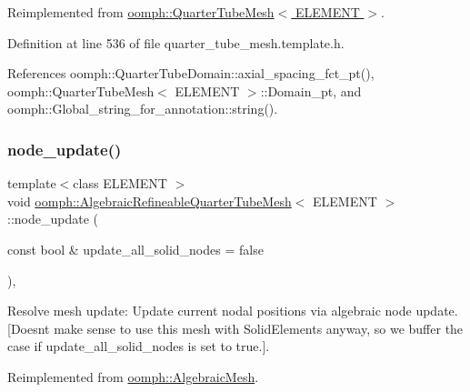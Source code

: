 Reimplemented from \hyperlink{classoomph_1_1QuarterTubeMesh_a5c880d6214a07676a533227f813634d8}{oomph\+::\+Quarter\+Tube\+Mesh$<$ E\+L\+E\+M\+E\+N\+T $>$}.



Definition at line 536 of file quarter\+\_\+tube\+\_\+mesh.\+template.\+h.



References oomph\+::\+Quarter\+Tube\+Domain\+::axial\+\_\+spacing\+\_\+fct\+\_\+pt(), oomph\+::\+Quarter\+Tube\+Mesh$<$ E\+L\+E\+M\+E\+N\+T $>$\+::\+Domain\+\_\+pt, and oomph\+::\+Global\+\_\+string\+\_\+for\+\_\+annotation\+::string().

\mbox{\label{classoomph_1_1AlgebraicRefineableQuarterTubeMesh_af521c0a76cf0bd14692979bd7747507d}} 
\subsubsection{\texorpdfstring{node\+\_\+update()}{node\_update()}}
{\footnotesize\ttfamily template$<$class E\+L\+E\+M\+E\+NT $>$ \\
void \hyperlink{classoomph_1_1AlgebraicRefineableQuarterTubeMesh}{oomph\+::\+Algebraic\+Refineable\+Quarter\+Tube\+Mesh}$<$ E\+L\+E\+M\+E\+NT $>$\+::node\+\_\+update (\begin{DoxyParamCaption}\item[{const bool \&}]{update\+\_\+all\+\_\+solid\+\_\+nodes = {\ttfamily false} }\end{DoxyParamCaption})\hspace{0.3cm}{\ttfamily [inline]}, {\ttfamily [virtual]}}



Resolve mesh update\+: Update current nodal positions via algebraic node update. \mbox{[}Doesn\textquotesingle{}t make sense to use this mesh with Solid\+Elements anyway, so we buffer the case if update\+\_\+all\+\_\+solid\+\_\+nodes is set to true.\mbox{]}. 



Reimplemented from \hyperlink{classoomph_1_1AlgebraicMesh_ad3a5638cacb6df1a47c475bb177b6ed7}{oomph\+::\+Algebraic\+Mesh}.



